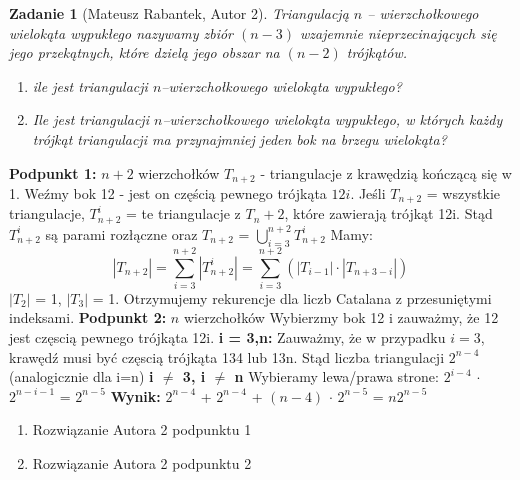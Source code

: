 \documentclass{mwart}
\newtheorem{zad}{Zadanie}[section]
\begin{document}
\begin{zad}[Mateusz Rabantek, Autor 2]
    Triangulacją $n$ -- wierzchołkowego wielokąta wypukłego nazywamy zbiór
    $(n - 3)$ wzajemnie nieprzecinających się jego przekątnych, które dzielą jego obszar na
    $(n - 2)$ trójkątów.
    \begin{enumerate}
        \item ile jest triangulacji $n$--wierzchołkowego wielokąta wypukłego?
        \item Ile jest triangulacji $n$--wierzchołkowego wielokąta wypukłego, w których każdy trójkąt
              triangulacji ma przynajmniej jeden bok na brzegu wielokąta?
    \end{enumerate}
\end{zad}
\begin{mdframed}
    \begin{enumerate}
        \textbf{Podpunkt 1:}\newline
        $n+2$ wierzchołków\newline
        $T_{n+2}$ - triangulacje z krawędzią kończącą się w 1. Weźmy bok 12 - jest on częścią pewnego trójkąta $12i$. Jeśli $T_{n+2}$ = wszystkie triangulacje, 
        $T_{n+2}^{i}$ = te triangulacje z $T_n+2$, które zawierają trójkąt 12i. Stąd ${T_{n+2}^{i}}$ są parami rozłączne oraz $T_{n+2}$ = $\bigcup_{i=3}^{n+2} T_{n+2}^{i}$
        \newline
        Mamy: 
        \[|T_{n+2}| = 
        \sum_{i=3}^{n+2} |T_{n+2}^{i}| = \sum_{i=3}^{n+2} \left( |T_{i-1}| \cdot |T_{n+3-i}| \right)
        \]
        $|T_2|$ = 1, $|T_3|$ = 1. Otrzymujemy rekurencje dla liczb Catalana z przesuniętymi indeksami.
        \newline
        \newline
        \textbf{Podpunkt 2:}\newline
        $n$ wierzchołków\newline
        Wybierzmy bok 12 i zauważmy, że 12 jest częscią pewnego trójkąta 12i.\newline
        \textbf{i = 3,n:}\newline
             Zauważmy, że w przypadku $i = 3$, krawędź musi być częscią trójkąta 134 lub 13n. Stąd liczba triangulacji $2^{n-4}$ (analogicznie dla i=n)
        \newline
        \textbf{i $\neq$ 3, i $\neq$ n}\newline
            Wybieramy lewa/prawa strone: $2^{i-4}$ $\cdot$ $2^{n-i-1}$ = $2^{n-5}$\newline
        \textbf{Wynik:} $2^{n-4}$ + $2^{n-4}$ + $(n-4)$ $\cdot$ $2^{n-5}$ = $n2^{n-5}$


    \end{enumerate}
\end{mdframed}
\begin{mdframed}
    \begin{enumerate}
        \item Rozwiązanie Autora 2 podpunktu 1
        \item Rozwiązanie Autora 2 podpunktu 2
    \end{enumerate}
\end{mdframed}
\end{document}
